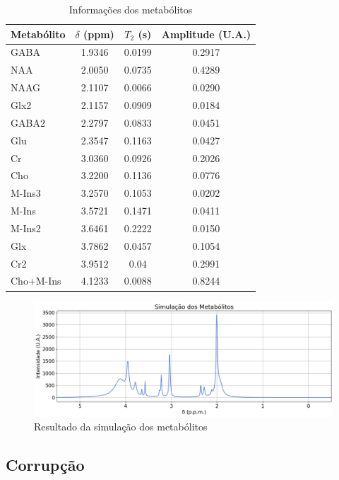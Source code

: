 \documentclass{article}
\begin{document}
\begin{table}[H] 
    \centering
    \begin{tabular}{|l|c|c|c|}
    \hline
    Metabólito & $\delta$ (ppm) & $T_2$ (s) & Amplitude (U.A.) \\
    \hline
    GABA & 1.9346 & 0.0199 & 0.2917 \\
    NAA & 2.0050 & 0.0735 & 0.4289 \\
    NAAG & 2.1107 & 0.0066 & 0.0290 \\
    Glx2 & 2.1157 & 0.0909 & 0.0184 \\
    GABA2 & 2.2797 & 0.0833 & 0.0451 \\
    Glu & 2.3547 & 0.1163 & 0.0427 \\
    Cr & 3.0360 & 0.0926 & 0.2026 \\
    Cho & 3.2200 & 0.1136 & 0.0776 \\
    M-Ins3 & 3.2570 & 0.1053 & 0.0202 \\
    M-Ins & 3.5721 & 0.1471 & 0.0411 \\
    M-Ins2 & 3.6461 & 0.2222 & 0.0150 \\
    Glx & 3.7862 & 0.0457 & 0.1054 \\
    Cr2 & 3.9512 & 0.04 & 0.2991 \\
    Cho+M-Ins & 4.1233 & 0.0088 & 0.8244 \\
    \hline
    \end{tabular}
    \caption{Informações dos metabólitos}
    \label{table:1}
\end{table}

\begin{figure} [H]
    \includegraphics[scale=0.37]{metabolites.png}
    \caption{Resultado da simulação dos metabólitos}
    \label{fig:4}
\end{figure}

\subsection{Corrupção}
\end{document}
